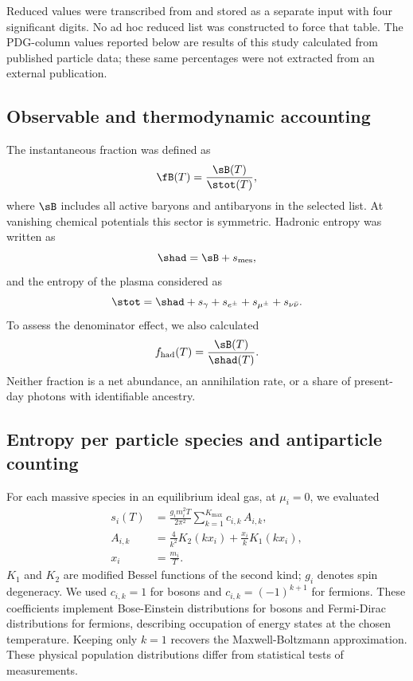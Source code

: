 Reduced values were transcribed from \citet{Garcia2026} and stored as a separate input with four significant digits. No ad hoc reduced list was constructed to force that table. The PDG-column values reported below are results of this study calculated from published particle data; these same percentages were not extracted from an external publication.

\subsection{Observable and thermodynamic accounting}
The instantaneous fraction was defined as
\begin{equation}
\fB(T)=\frac{\sB(T)}{\stot(T)},
\label{eq:f}
\end{equation}
where $\sB$ includes all active baryons and antibaryons in the selected list. At vanishing chemical potentials this sector is symmetric. Hadronic entropy was written as
\begin{equation}
\shad=\sB+s_{\rm mes},
\end{equation}
and the entropy of the plasma considered as
\begin{equation}
\stot=\shad+s_\gamma+s_{e^\pm}+s_{\mu^\pm}+s_{\nu\bar\nu}.
\label{eq:den}
\end{equation}
To assess the denominator effect, we also calculated
\begin{equation}
f_{\rm had}(T)=\frac{\sB(T)}{\shad(T)}.
\label{eq:fhad}
\end{equation}
Neither fraction is a net abundance, an annihilation rate, or a share of present-day photons with identifiable ancestry.

\subsection{Entropy per particle species and antiparticle counting}
For each massive species in an equilibrium ideal gas, at $\mu_i=0$, we evaluated
\begin{align}
s_i(T)&=\frac{g_i m_i^2T}{2\pi^2}
\sum_{k=1}^{K_{\max}}c_{i,k}\,A_{i,k},\label{eq:entropy}\\
A_{i,k}&=\frac{4}{k^2}K_2(kx_i)+\frac{x_i}{k}K_1(kx_i),\\
x_i&=\frac{m_i}{T}.\nonumber
\end{align}
$K_1$ and $K_2$ are modified Bessel functions of the second kind; $g_i$ denotes spin degeneracy. We used $c_{i,k}=1$ for bosons and $c_{i,k}=(-1)^{k+1}$ for fermions. These coefficients implement Bose-Einstein distributions for bosons and Fermi-Dirac distributions for fermions, describing occupation of energy states at the chosen temperature. Keeping only $k=1$ recovers the Maxwell-Boltzmann approximation. These physical population distributions differ from statistical tests of measurements.


